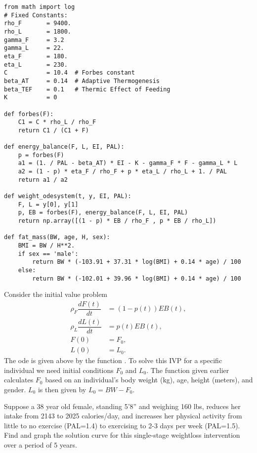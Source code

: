 \begin{lstlisting}
from math import log
# Fixed Constants:
rho_F       = 9400.
rho_L       = 1800.
gamma_F     = 3.2
gamma_L     = 22.
eta_F       = 180.
eta_L       = 230.
C           = 10.4  # Forbes constant
beta_AT     = 0.14  # Adaptive Thermogenesis
beta_TEF    = 0.1   # Thermic Effect of Feeding
K           = 0

def forbes(F):
    C1 = C * rho_L / rho_F
    return C1 / (C1 + F)

def energy_balance(F, L, EI, PAL):
    p = forbes(F)
    a1 = (1. / PAL - beta_AT) * EI - K - gamma_F * F - gamma_L * L
    a2 = (1 - p) * eta_F / rho_F + p * eta_L / rho_L + 1. / PAL
    return a1 / a2

def weight_odesystem(t, y, EI, PAL):
    F, L = y[0], y[1]
    p, EB = forbes(F), energy_balance(F, L, EI, PAL)
    return np.array([(1 - p) * EB / rho_F , p * EB / rho_L])

def fat_mass(BW, age, H, sex):
    BMI = BW / H**2.
    if sex == 'male':
        return BW * (-103.91 + 37.31 * log(BMI) + 0.14 * age) / 100
    else:
        return BW * (-102.01 + 39.96 * log(BMI) + 0.14 * age) / 100

\end{lstlisting}

\begin{problem}
Consider the initial value problem
\begin{subequations}
\label{eqn:weight_prob1}
\begin{align*}
\rho_F \dfrac{dF(t)}{dt} &= (1-p(t)) EB(t),\\
\rho_L \dfrac{dL(t)}{dt} &= p(t) EB(t),\\
F(0) &= F_0, \\
L(0) &= L_0.
\end{align*}
\end{subequations}
The ode is given above by the function .
To solve this IVP for a specific individual we need initial conditions $F_0$ and $L_0.$
The function  given earlier calculates $F_0$ based on an individual's body weight (kg), age, height (meters), and gender.
$L_0$ is then given by $L_0 = BW - F_0$.

Suppose a 38 year old female, standing 5'8'' and weighing 160 lbs, reduces her intake from 2143 to 2025 calories/day, and increases her physical activity from little to no exercise (PAL=1.4) to exercising to 2-3 days per week (PAL=1.5).
Find and graph the solution curve for this single-stage weightloss intervention over a period of 5 years.
\end{problem}

